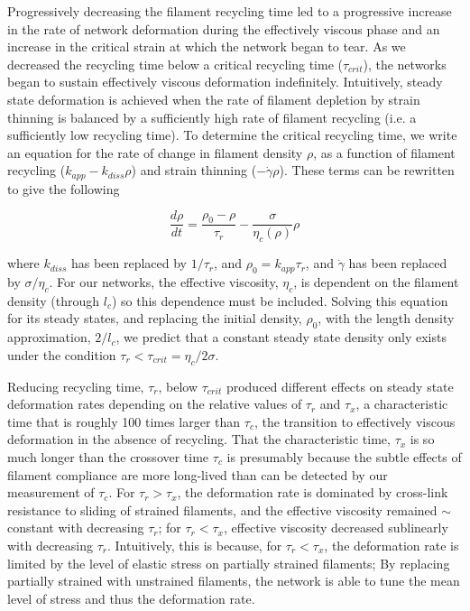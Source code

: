 \documentclass[10pt,letterpaper]{article}
\begin{document}
Progressively decreasing the filament recycling time led to a progressive increase in the rate of network deformation during the effectively viscous phase and an increase in the critical strain at which the network began to tear. As we decreased the recycling time below a critical recycling time ($\tau_{crit}$), the networks began to sustain effectively viscous deformation indefinitely. Intuitively, steady state deformation is achieved when the rate of filament depletion by strain thinning is balanced by a sufficiently high rate of filament recycling (i.e. a sufficiently low recycling time).  To determine the critical recycling time, we write an equation for the rate of change in filament density $\rho$, as a function of filament recycling ($k_{app}-k_{diss}\rho$) and strain thinning ($-\dot{\gamma}\rho$).
These terms can be rewritten to give the following 

\begin{equation}
\frac{d \rho}{dt} = \frac{\rho_0-\rho}{\tau_r}  - \frac{\sigma}{\eta_c(\rho)} \rho
\end{equation}

where $k_{diss}$  has been replaced by $1/\tau_r$, and $\rho_0 = k_{app}\tau_r$, and $\dot{\gamma}$ has been replaced by $\sigma/\eta_c$.  For our networks, the effective viscosity, $\eta_c$, is dependent on the filament density (through $l_c$) so this dependence must be included. Solving this equation for its steady states, and replacing the initial density, $\rho_0$, with the length density approximation, $2/l_c$, we predict that a constant steady state density only exists under the condition $\tau_r < \tau_{crit}=\eta_c/2\sigma$.  

Reducing recycling time, $\tau_r$, below $\tau_{crit}$ produced different effects on steady state deformation rates depending on the relative values of $\tau_r$ and $\tau_x$, a characteristic time that is roughly 100 times larger than $\tau_c$, the transition to effectively viscous deformation in the absence of recycling.  That the characteristic time, $\tau_x$ is so much longer than the crossover time $\tau_c$ is presumably because the subtle effects of filament compliance are more long-lived than can be detected by our measurement of $\tau_c$.  For $\tau_r > \tau_x$, the deformation rate is dominated by cross-link resistance to sliding of strained filaments, and the effective viscosity remained $\sim$constant with decreasing $\tau_r$; for $\tau_r < \tau_x$, effective viscosity decreased sublinearly with decreasing $\tau_r$. Intuitively, this is because, for $\tau_r < \tau_x$, the deformation rate is limited by the level of elastic stress on partially strained filaments; By replacing partially strained with unstrained filaments, the network is able to tune the mean level of stress and thus the deformation rate.
\end{document}
